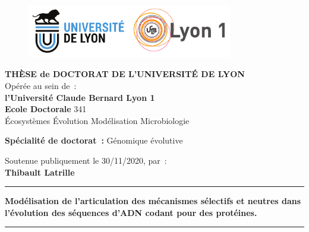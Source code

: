 \thispagestyle{empty}

\unitlength 1cm
\begin{center}

    \vspace*{-2.5cm}
    \begin{figure}[h]
        \centering
        \includegraphics[width=0.8\textwidth]{figures/logo-UdL-UCB}
    \end{figure}

    {\large \textbf{THÈSE de DOCTORAT DE L'UNIVERSITÉ DE LYON}\\}
    {Opérée au sein de~:\\}
    {\large \textbf{l'Université Claude Bernard Lyon 1}\\}
    \vspace{12pt}
    {\large \textbf{Ecole Doctorale} 341 \\
    \vspace{0.15cm}
    Écosystèmes Évolution Modélisation Microbiologie
    }
    
    \vspace{12pt}

    {\large \textbf{Spécialité de doctorat~:} Génomique évolutive
    \\}

    \vspace{0.8cm}

    {Soutenue publiquement le 30/11/2020, par~:\\}
    \vspace{0.15cm}
    {\Large \textbf{Thibault Latrille}}
    \vspace{0.5cm}

    \rule{5cm}{1pt}
    \vspace{12pt}

    {\huge \textbf{Modélisation de l'articulation des mécanismes sélectifs et neutres dans l’évolution des séquences d’ADN codant pour des protéines.}\par}

    \vspace{12pt}
    \rule{5cm}{1pt}

    \vspace{0.5cm}

\end{center}

